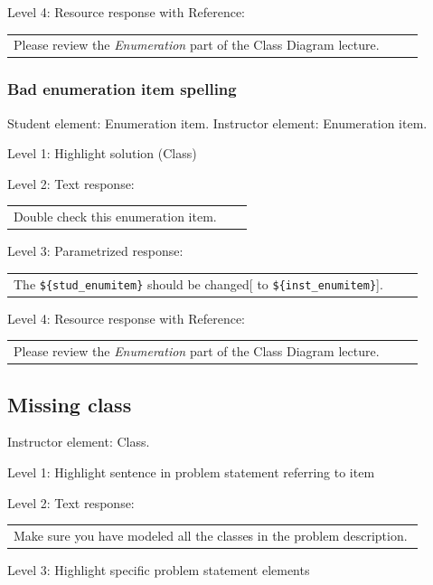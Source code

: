 \noindent Level 4: Resource response with Reference: \medskip

\begin{tabular}{|p{0.9\linewidth}}
Please review the \textit{Enumeration} part of the Class Diagram lecture.
\end{tabular} \medskip


\subsubsection{Bad enumeration item spelling}

Student element: Enumeration item. Instructor element: Enumeration item. \medskip

\noindent Level 1: Highlight solution (Class) \medskip

\noindent Level 2: Text response: \medskip

\begin{tabular}{|p{0.9\linewidth}}
Double check this enumeration item.
\end{tabular} \medskip

\noindent Level 3: Parametrized response: \medskip

\begin{tabular}{|p{0.9\linewidth}}
The \verb|${stud_enumitem}| should be changed[ to \verb|${inst_enumitem}|].
\end{tabular} \medskip

\noindent Level 4: Resource response with Reference: \medskip

\begin{tabular}{|p{0.9\linewidth}}
Please review the \textit{Enumeration} part of the Class Diagram lecture.
\end{tabular} \medskip


\subsection{Missing class}

Instructor element: Class. \medskip

\noindent Level 1: Highlight sentence in problem statement referring to item \medskip

\noindent Level 2: Text response: \medskip

\begin{tabular}{|p{0.9\linewidth}}
Make sure you have modeled all the classes in the problem description.
\end{tabular} \medskip

\noindent Level 3: Highlight specific problem statement elements \medskip

